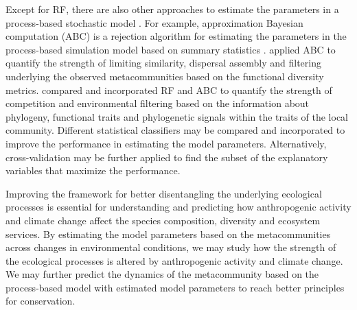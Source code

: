 Except for RF, there are also other approaches to estimate the parameters in a process-based stochastic model \citep{hartig2011statistical}. For example, approximation Bayesian computation (ABC) is a rejection algorithm for estimating the parameters in the process-based simulation model based on summary statistics \citep{csillery2010approximate}. \citet{van2015new} applied ABC to quantify the strength of limiting similarity, dispersal assembly and filtering underlying the observed metacommunities based on the functional diversity metrics. \citet{ruffley2019identifying} compared and incorporated RF and ABC to quantify the strength of competition and environmental filtering based on the information about phylogeny, functional traits and phylogenetic signals within the traits of the local community. Different statistical classifiers may be compared and incorporated to improve the performance in estimating the model parameters. Alternatively, cross-validation may be further applied to find the subset of the explanatory variables that maximize the performance.

Improving the framework for better disentangling the underlying ecological processes is essential for understanding and predicting how anthropogenic activity and climate change affect the species composition, diversity and ecosystem services. By estimating the model parameters based on the metacommunities across changes in environmental conditions, we may study how the strength of the ecological processes is altered by anthropogenic activity and climate change. We may further predict the dynamics of the metacommunity based on the process-based model with estimated model parameters to reach better principles for conservation.




